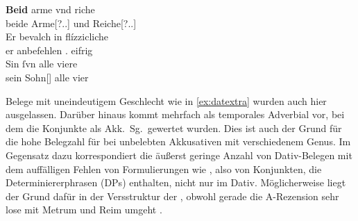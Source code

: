 \begin{exe}
\begin{xlist}
	\ex \label{ex:datextra_2}
		\gll \textbf{Beid} arme vnd riche \\
			beide Arme[\Dat?.\Pl.\MascA] und Reiche[\Dat?.\Pl.\MascA] \\
	\sn \gll Er bevalch in flízzicliche \\
			er anbefehlen \Tpl.\Dat{} eifrig \\
	\sn \gll Sin ſvn alle viere \\
			sein Sohn[\Pl] alle vier \\
		\begin{taggedline}{\parencites[\pno~94\rb, 23--26]{kc:VB}[zu][13854--13855]{schroeder1895}}
		\trans {}
		\end{taggedline}
	\end{xlist}
\end{exe}

Belege mit uneindeutigem Geschlecht wie in \cref{ex:datextra} wurden auch hier
ausgelassen. Darüber hinaus kommt   mehrfach als temporales Adverbial vor, bei dem die
Konjunkte als Akk.\ Sg.\ gewertet wurden. Dies ist auch der Grund für die hohe
Belegzahl für  bei unbelebten Akkusativen mit verschiedenem Genus.
Im Gegensatz dazu korrespondiert die äußerst geringe Anzahl von Dativ-Belegen
mit dem auffälligen Fehlen von Formulierungen wie  
\autocites(Augsburg, 1280)[\pno~429, 382.8]{cao1}, also von Konjunkten, die
Determiniererphrasen (DPs) enthalten, nicht nur im Dativ. Möglicherweise liegt
der Grund dafür in der Versstruktur der \citet{kc}, obwohl gerade die
A-Rezension sehr lose mit Metrum und Reim umgeht \autocite[92]{wolf2008}.

